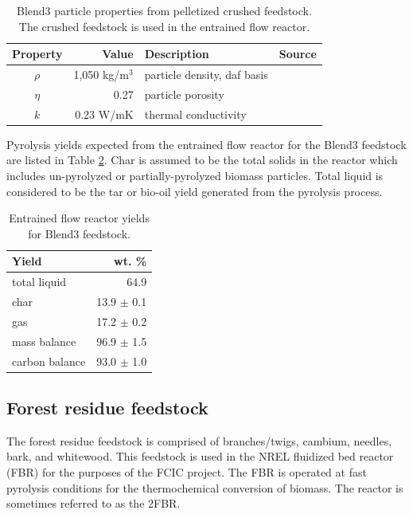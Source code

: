 \begin{table}[H]
    \centering
    \caption{Blend3 particle properties from pelletized crushed feedstock. The crushed feedstock is used in the entrained flow reactor.}
    \label{tab:blend3-properties}
    \begin{tabular}{crlc}
        \toprule
        Property & Value & Description & Source \\
        \midrule
        $\rho$  & 1,050 kg/m$^3$ & particle density, daf basis & \cite{Pecha-2018} \\
        $\eta$  & 0.27           & particle porosity & \\
        $k$     & 0.23 W/mK      & thermal conductivity & \\
        \bottomrule
    \end{tabular}
\end{table}

Pyrolysis yields expected from the entrained flow reactor for the Blend3 feedstock are listed in Table \ref{tab:blend3-efr-yields}. Char is assumed to be the total solids in the reactor which includes un-pyrolyzed or partially-pyrolyzed biomass particles. Total liquid is considered to be the tar or bio-oil yield generated from the pyrolysis process.

\begin{table}[H]
    \centering
    \caption{Entrained flow reactor yields for Blend3 feedstock.}
    \label{tab:blend3-efr-yields}
    \begin{tabular}{lr}
        \toprule
        Yield & wt. \% \\
        \midrule
        total liquid   & 64.9 \\
        char           & 13.9 $\pm$ 0.1 \\
        gas            & 17.2 $\pm$ 0.2 \\
        mass balance   & 96.9 $\pm$ 1.5 \\
        carbon balance & 93.0 $\pm$ 1.0 \\
        \bottomrule
    \end{tabular}
\end{table}

\subsection{Forest residue feedstock}

The forest residue feedstock is comprised of branches/twigs, cambium, needles, bark, and whitewood. This feedstock is used in the NREL fluidized bed reactor (FBR) for the purposes of the FCIC project. The FBR is operated at fast pyrolysis conditions for the thermochemical conversion of biomass. The reactor is sometimes referred to as the 2FBR.

